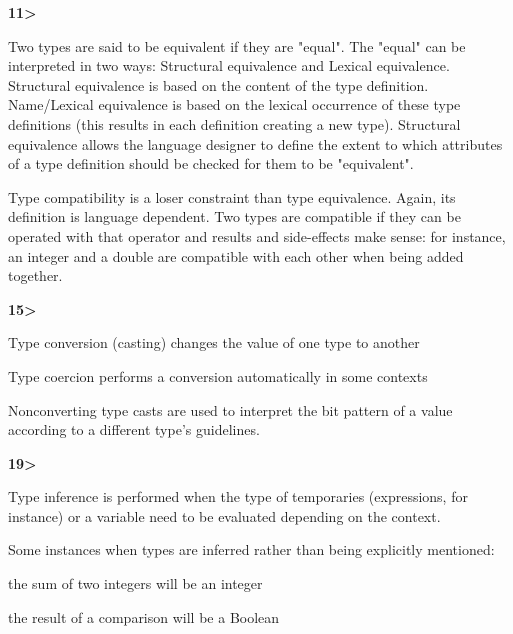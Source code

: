 \documentclass[12pt]{article}
\renewcommand{\_}{\kern-1.5pt\textunderscore\kern-1.5pt}
\begin{document}
\vspace{\baselineskip}
\textbf{11>}\par

Two types are said to be equivalent if they are "equal". The "equal" can be interpreted in two ways: Structural equivalence and Lexical equivalence. Structural equivalence is based on the content of the type definition. Name/Lexical equivalence is based on the lexical occurrence of these type definitions (this results in each definition creating a new type). Structural equivalence allows the language designer to define the extent to which attributes of a type definition should be checked for them to be "equivalent".\par

Type compatibility is a loser constraint than type equivalence. Again, its definition is language dependent. Two types are compatible if they can be operated with that operator and results and side-effects make sense: for instance, an integer and a double are compatible with each other when being added together. \par


\vspace{\baselineskip}
\textbf{15>}\par

Type conversion (casting) changes the value of one type to another\par

Type coercion performs a conversion automatically in some contexts\par

Nonconverting type casts are used to interpret the bit pattern of a value according to a different type's guidelines.\par


\vspace{\baselineskip}
\textbf{19>}\par

Type inference is performed when the type of temporaries (expressions, for instance) or a variable need to be evaluated depending on the context. \par

Some instances when types are inferred rather than being explicitly mentioned:\par

the sum of two integers will be an integer\par

the result of a comparison will be a Boolean\par
\end{document}

